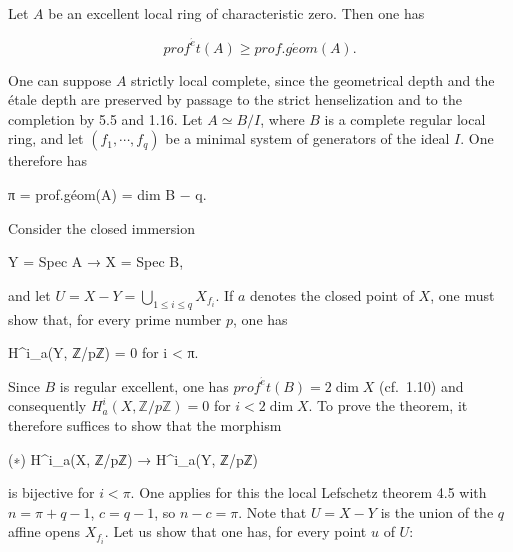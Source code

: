 \documentclass[
]{article}
\newenvironment{Shaded}{}{}
\newcommand{\NormalTok}[1]{#1}
\begin{document}
Let \(A\) be an excellent local ring of characteristic zero. Then one
has

\[
prof^{\acute{e}}t(A) \geqslant prof.g\acute{e}om(A).
\]

One can suppose \(A\) strictly local complete, since the geometrical
depth and the étale depth are preserved by passage to the strict
henselization and to the completion by 5.5 and 1.16. Let
\(A \simeq B/I\), where \(B\) is a complete regular local ring, and let
\((f_{1}, \cdots, f_{q})\) be a minimal system of generators of the
ideal \(I\). One therefore has

\begin{Shaded}
\begin{Highlighting}[]
\NormalTok{π = prof.géom(A) = dim B − q.}
\end{Highlighting}
\end{Shaded}

Consider the closed immersion

\begin{Shaded}
\begin{Highlighting}[]
\NormalTok{Y = Spec A → X = Spec B,}
\end{Highlighting}
\end{Shaded}

and let \(U = X - Y = \bigcup_{1 \leqslant i \leqslant q} X_{f_{i}}\).
If \(a\) denotes the closed point of \(X\), one must show that, for
every prime number \(p\), one has

\begin{Shaded}
\begin{Highlighting}[]
\NormalTok{H\^{}i\_a(Y, ℤ/pℤ) = 0 for i \textless{} π.}
\end{Highlighting}
\end{Shaded}

Since \(B\) is regular excellent, one has
\(prof^{\acute{e}}t(B) = 2 \dim X\) (cf.~1.10) and consequently
\(H^{i}_{a}(X, \mathbb{Z}/p\mathbb{Z}) = 0\) for \(i < 2 \dim X\). To
prove the theorem, it therefore suffices to show that the morphism

\begin{Shaded}
\begin{Highlighting}[]
\NormalTok{(∗) H\^{}i\_a(X, ℤ/pℤ) → H\^{}i\_a(Y, ℤ/pℤ)}
\end{Highlighting}
\end{Shaded}

is bijective for \(i < \pi\). One applies for this the local Lefschetz
theorem 4.5 with \(n = \pi + q - 1\), \(c = q - 1\), so \(n - c = \pi\).
Note that \(U = X - Y\) is the union of the \(q\) affine opens
\(X_{f_{i}}\). Let us show that one has, for every point \(u\) of \(U\):
\end{document}

